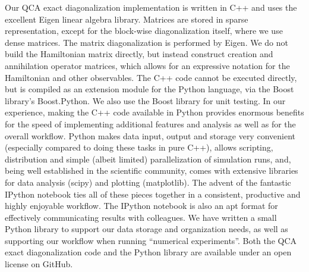 Our QCA exact diagonalization implementation is written in C++ and uses the
excellent Eigen linear algebra library. Matrices are stored in sparse
representation, except for the block-wise diagonalization itself, where we use
dense matrices. The matrix diagonalization is performed by Eigen. We do not
build the Hamiltonian matrix directly, but instead construct creation and
annihilation operator matrices, which allows for an expressive notation for the
Hamiltonian and other observables. The C++ code cannot be executed directly,
but is compiled as an extension module for the Python language, via the Boost library's
Boost.Python. We also use the Boost library for unit testing. In our experience,
making the C++ code available in Python provides enormous benefits for the speed
of implementing additional features and analysis as well as for the overall
workflow. Python makes data input, output and storage very convenient
(especially compared to doing these tasks in pure C++), allows scripting,
distribution and simple (albeit limited) parallelization of simulation runs,
and, being well established in the scientific community, comes with extensive
libraries for data analysis (scipy) and plotting (matplotlib). The advent of the
fantastic IPython notebook ties all of these pieces together in a consistent,
productive and highly enjoyable workflow. The IPython notebook is also an apt
format for effectively communicating results with colleagues. We have written a
small Python library to support our data storage and organization needs, as well
as supporting our workflow when running ``numerical experiments''. Both the QCA
exact diagonalization code and the Python library are available under an open
license on GitHub.




















